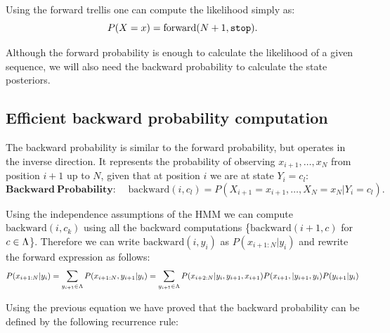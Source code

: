 Using the forward trellis one can compute the likelihood simply as:
\begin{equation}
\label{eq:forwardSum}
P(X=x) = \mathrm{forward}(N+1, \text{\tt stop}).
\end{equation}

Although the forward probability is enough to calculate the likelihood of a given sequence, we will also need the backward probability to calculate the state posteriors. 


\subsection*{Efficient backward probability computation}

The backward probability is similar to the forward probability, but operates in the inverse direction.
It represents the probability of observing $x_{i+1},\ldots,x_N$ from position $i+1$ up to $N$, given that at position $i$ we are at state $Y_i = c_l$:
 \begin{equation}
\label{eq::backward}
\mathbf{Backward \ Probability\!:}\;\;\;\;  \mathrm{backward}(i, c_l) = P(X_{i+1}=x_{i+1},\ldots, X_N=x_N | Y_i = c_l).
\end{equation}

Using the independence assumptions of the HMM we can compute $\mathrm{backward}(i, c_k)$ using all the backward computations \{$\mathrm{backward}(i +1, c)$ for $c \in \Lambda$\}. Therefore we can write   $\mathrm{backward}(i, y_i) $ as $P( x_{i+1:N} | y_i ) $ and rewrite the forward expression as follows:
\begin{equation}
\label{eq::backward2}
  P( x_{i+1:N} | y_i ) =  \sum_{y_{i+1} \in \Lambda} P( x_{i+1:N}, y_{i+1} | y_i)  =  \sum_{y_{i+1} \in \Lambda} P( x_{i+2:N} | y_i, y_{i+1}, x_{i+1}) 
   P( x_{i+1}, |  y_{i+1},  y_{i}) P( y_{i+1} | y_i)
\end{equation}

Using the previous equation we have proved that the backward probability can be defined by the following recurrence rule:

